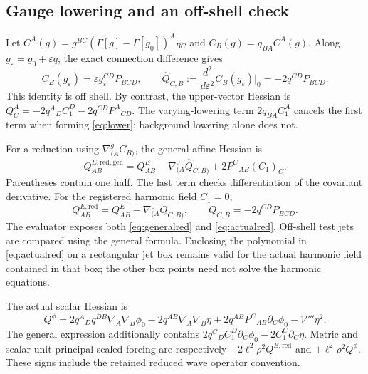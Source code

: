 \documentclass[11pt]{article}
\newcommand{\eps}{\varepsilon}
\begin{document}
\subsection{Gauge lowering and an off-shell check}

Let $C^A(g)=g^{BC}(\Gamma[g]-\Gamma[g_0])^A{}_{BC}$ and
$C_B(g)=g_{BA}C^A(g)$. Along $g_\eps=g_0+\eps q$, the exact connection
difference gives
\begin{equation}
 C_B(g_\eps)=\eps g_\eps^{CD}P_{BCD},\qquad
 \widehat Q_{C,B}:=\frac{d^2}{d\eps^2}C_B(g_\eps)\big|_0
 =-2q^{CD}P_{BCD}.                                      \label{eq:lower}
\end{equation}
This identity is off shell. By contrast, the upper-vector Hessian is
$Q_C^A=-2q^A{}_D C_1^D-2q^{CD}P^A{}_{CD}$.
The varying-lowering term $2q_{BA}C_1^A$ cancels the first term when forming
\eqref{eq:lower}; background lowering alone does not.

For a reduction using $\nabla^g_{(A}C_{B)}$, the general affine Hessian is
\begin{equation}
 Q^{E,\mathrm{red,gen}}_{AB}=Q^E_{AB}
       -\nabla^0_{(A}\widehat Q_{C,B)}+2P^C{}_{AB}(C_1)_C.
 \label{eq:generalred}
\end{equation}
Parentheses contain one half. The last term checks differentiation of the
covariant derivative. For the registered harmonic field $C_1=0$,
\begin{equation}
 Q^{E,\mathrm{red}}_{AB}=Q^E_{AB}-\nabla^0_{(A}Q_{C,B)},\qquad
 Q_{C,B}=-2q^{CD}P_{BCD}.                              \label{eq:actualred}
\end{equation}
The evaluator exposes both \eqref{eq:generalred} and \eqref{eq:actualred}.
Off-shell test jets are compared using the general formula. Enclosing the
polynomial in \eqref{eq:actualred} on a rectangular jet box remains valid
for the actual harmonic field contained in that box; the other box points
need not solve the harmonic equations.

The actual scalar Hessian is
\begin{equation}
 Q^\phi=2q^A{}_Dq^{DB}\nabla_A\nabla_B\phi_0
       -2q^{AB}\nabla_A\nabla_B\eta
       +2q^{AB}P^C{}_{AB}\partial_C\phi_0
       -\mathcal V'''\eta^2.                         \label{eq:scalar}
\end{equation}
The general expression additionally contains
$2q^C{}_D C_1^D\partial_C\phi_0-2C_1^C\partial_C\eta$.
Metric and scalar unit-principal scaled forcing are respectively
$-2\ell^2\rho^2Q^{E,\mathrm{red}}$ and $+\ell^2\rho^2Q^\phi$.
These signs include the retained reduced wave operator convention.
\end{document}
